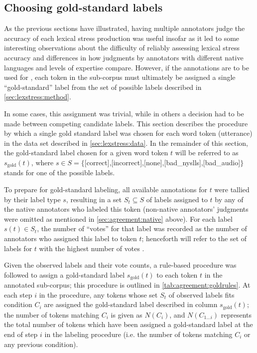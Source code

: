 		\subsection{Choosing gold-standard labels}
		\label{sec:agreement:gold}
		
		
		As the previous sections have illustrated, having multiple annotators judge the accuracy of each lexical stress production was useful insofar as it led to some interesting observations about the difficulty of reliably assessing lexical stress accuracy and differences in how judgments by annotators with different native languages and levels of expertise compare. However, if the annotations are to be used for , each token in the sub-corpus must ultimately be assigned a single ``gold-standard'' label from the set of possible labels described in \cref{sec:lexstress:method}.
		
		In some cases, this assignment was trivial, while in others a decision had to be made between competing candidate labels. This section describes the procedure by which a single gold standard label was chosen for each word token (utterance) in the data set described in \cref{sec:lexstress:data}. In the remainder of this section, the gold-standard label chosen for a given word token $t$ will be referred to as $s_{\text{gold}}(t)$, where $s \in S = \{$[correct],{[incorrect]},{[none]},{[bad\_nyslls]},{[bad\_audio]}$\}$ stands for one of the possible labels.
		
		To prepare for gold-standard labeling, all available annotations for $t$ were tallied by their label type $s$, resulting in a set $S_t \subseteq S$ of labels assigned to $t$ by any of the native annotators who labeled this token (non-native annotators' judgments were omitted as mentioned in \cref{sec:agreement:native} above). For each label $s(t) \in S_t$, the number of ``votes'' for that label was recorded as the number of annotators who assigned this label to token $t$; henceforth  will refer to the set of labels for $t$ with the highest number of votes .
		
		Given the observed labels and their vote counts, a rule-based procedure was followed to assign a gold-standard label $s_{\text{gold}}(t)$ to each token $t$ in the annotated sub-corpus; this procedure is outlined in \cref{tab:agreement:goldrules}. At each step $i$ in the procedure, any tokens whose set $S_t$ of observed labels fits condition $C_i$ are assigned the gold-standard label described in column $s_{\text{gold}}(t)$; the number of tokens matching $C_i$ is given as $N(C_i)$, and 
		$N(C_{1 \dots i})$ represents the total number of tokens which have been assigned a gold-standard label at the end of step $i$ in the labeling procedure (i.e. the number of tokens matching $C_i$ or any previous condition).
		
